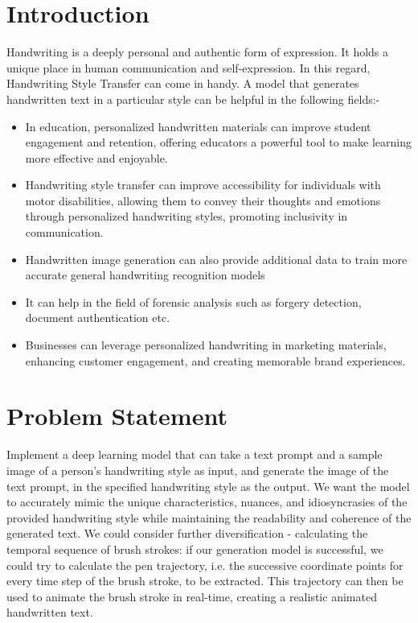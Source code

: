 \documentclass[10pt,twocolumn,letterpaper]{article}
\begin{document}
\section{Introduction}
\label{sec:introduction}
Handwriting is a deeply personal and authentic form of expression. It holds a unique place in human communication and self-expression. In this regard, Handwriting Style Transfer can come in handy. A model that generates handwritten text in a particular style can be helpful in the following fields:-
\begin{itemize}
    \item In education, personalized handwritten materials can improve student engagement and retention, offering educators a powerful tool to make learning more effective and enjoyable.
    \item Handwriting style transfer can improve accessibility for individuals with motor disabilities, allowing them to convey their thoughts and emotions through personalized handwriting styles, promoting inclusivity in communication.
    \item Handwritten image generation can also provide additional data to train more accurate general handwriting recognition models 
    \item It can help in the field of forensic analysis such as forgery detection, document authentication etc.
    \item Businesses can leverage personalized handwriting in marketing materials, enhancing customer engagement, and creating memorable brand experiences.
\end{itemize}

\section{Problem Statement}
\label{sec: PS}
Implement a deep learning model that can take a text prompt and a sample image of a person's handwriting style as input, and generate the image of the text prompt, in the specified handwriting style as the output. We want the model to accurately mimic the unique characteristics, nuances, and idiosyncrasies of the provided handwriting style while maintaining the readability and coherence of the generated text. We could consider further diversification - calculating the temporal sequence of brush strokes: if our generation model is successful, we could try to calculate the pen trajectory, i.e. the successive coordinate points for every time step of the brush stroke, to be extracted. This trajectory can then be used to animate the brush stroke in real-time, creating a realistic animated handwritten text.  
\end{document}
